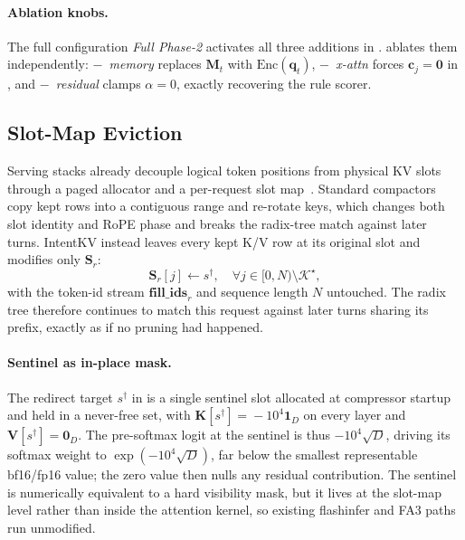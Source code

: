 \documentclass[11pt]{article}
\newcommand{\method}{IntentKV\xspace}
\newcommand{\learn}{Phase-2\xspace}
\begin{document}
\paragraph{Ablation knobs.}
The full configuration \emph{Full \learn} activates all three
additions in . 
ablates them independently: \emph{$-$~memory} replaces
$\mathbf{M}_t$ with $\mathrm{Enc}(\mathbf{q}_t)$,
\emph{$-$~x-attn} forces $\mathbf{c}_j\!=\!\mathbf{0}$ in
, and \emph{$-$~residual} clamps $\alpha\!=\!0$,
exactly recovering the rule scorer.

\subsection{Slot-Map Eviction}
\label{sec:method-layout}

Serving stacks already decouple logical token positions from
physical KV slots through a paged allocator and a per-request slot
map~\citep{kwon2023efficient,zheng2024sglang}. Standard compactors copy kept rows into a
contiguous range and re-rotate keys, which changes both slot
identity and RoPE phase and breaks the radix-tree match against
later turns. \method instead leaves every kept K/V row at its
original slot and modifies only $\mathbf{S}_r$:
\begin{equation}
\mathbf{S}_r[j]\leftarrow s^{\dagger},\quad
\forall j\in[0,N)\setminus\mathcal{K}^{\star},
\label{eq:redirect}
\end{equation}
with the token-id stream $\mathbf{fill\_ids}_r$ and sequence length
$N$ untouched. The radix tree therefore continues to match this
request against later turns sharing its prefix, exactly as if no
pruning had happened.

\paragraph{Sentinel as in-place mask.}
The redirect target $s^{\dagger}$ in  is a single
sentinel slot allocated at compressor startup and held in a
never-free set, with
$\mathbf{K}[s^{\dagger}]\!=\!-10^{4}\mathbf{1}_D$ on every layer and
$\mathbf{V}[s^{\dagger}]\!=\!\mathbf{0}_D$. The pre-softmax logit at
the sentinel is thus $-10^{4}\sqrt{D}$, driving its softmax weight
to $\exp(-10^{4}\sqrt{D})$, far below the smallest representable
bf16/fp16 value; the zero value then nulls any residual
contribution. The sentinel is numerically equivalent to a hard
visibility mask, but it lives at the slot-map level rather than
inside the attention kernel, so existing flashinfer and FA3 paths
run unmodified.
\end{document}
